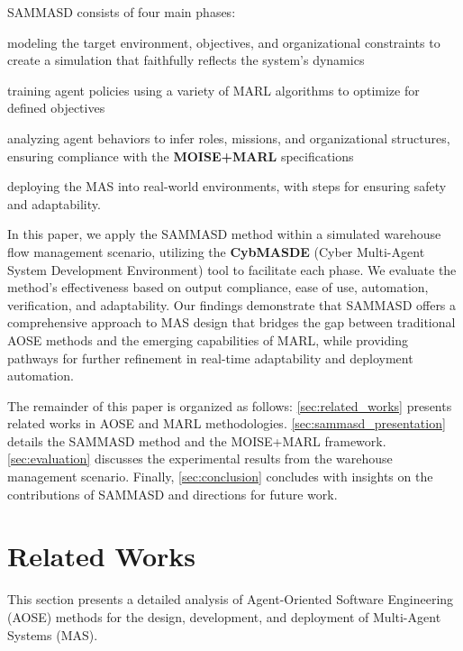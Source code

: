 \documentclass[sigconf,anonymous]{aamas}
\begin{document}
SAMMASD consists of four main phases:
\begin{enumerate*}[label=\roman*,itemjoin={; \quad}]
  \item modeling the target environment, objectives, and organizational constraints to create a simulation that faithfully reflects the system's dynamics
  \item training agent policies using a variety of MARL algorithms to optimize for defined objectives
  \item analyzing agent behaviors to infer roles, missions, and organizational structures, ensuring compliance with the \textbf{MOISE+MARL} specifications
  \item deploying the MAS into real-world environments, with steps for ensuring safety and adaptability.
\end{enumerate*}

In this paper, we apply the SAMMASD method within a simulated warehouse flow management scenario, utilizing the \textbf{CybMASDE} (Cyber Multi-Agent System Development Environment) tool to facilitate each phase. We evaluate the method's effectiveness based on output compliance, ease of use, automation, verification, and adaptability. Our findings demonstrate that SAMMASD offers a comprehensive approach to MAS design that bridges the gap between traditional AOSE methods and the emerging capabilities of MARL, while providing pathways for further refinement in real-time adaptability and deployment automation.

The remainder of this paper is organized as follows: \autoref{sec:related_works} presents related works in AOSE and MARL methodologies. \autoref{sec:sammasd_presentation} details the SAMMASD method and the MOISE+MARL framework. \autoref{sec:evaluation} discusses the experimental results from the warehouse management scenario. Finally, \autoref{sec:conclusion} concludes with insights on the contributions of SAMMASD and directions for future work.


\section{Related Works}
\label{sec:related_works}

This section presents a detailed analysis of Agent-Oriented Software Engineering (AOSE) methods for the design, development, and deployment of Multi-Agent Systems (MAS).
\end{document}

